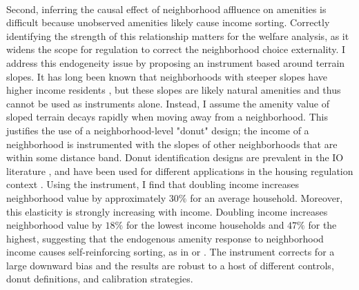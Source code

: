 \documentclass[11pt]{article}
\begin{document}
	\paragraph*{}
	Second, inferring the causal effect of neighborhood affluence on amenities is difficult because unobserved amenities likely cause income sorting. Correctly identifying the strength of this relationship matters for the welfare analysis, as it widens the scope for regulation to correct the neighborhood choice externality. I address this endogeneity issue by proposing an instrument based around terrain slopes. It has long been known that neighborhoods with steeper slopes have higher income residents \citep{saiz2010}, but these slopes are likely natural amenities and thus cannot be used as instruments alone. Instead, I assume the amenity value of sloped terrain decays rapidly when moving away from a neighborhood. This justifies the use of a neighborhood-level "donut" design; the income of a neighborhood is instrumented with the slopes of other neighborhoods that are within some distance band. Donut identification designs are prevalent in the IO literature \citep{BFMJPE}, and have been used for different applications in the housing regulation context \citep{anagoletal2021}. Using the instrument, I find that doubling income increases neighborhood value by approximately $30\%$ for an average household. Moreover, this elasticity is strongly increasing with income. Doubling income increases neighborhood value by $18\%$ for the lowest income households and $47\%$ for the highest, suggesting that the endogenous amenity response to neighborhood income causes self-reinforcing sorting, as in \cite{diamond2016} or \cite{su2021}. The instrument corrects for a large downward bias and the results are robust to a host of different controls, donut definitions, and calibration strategies.
\end{document}
